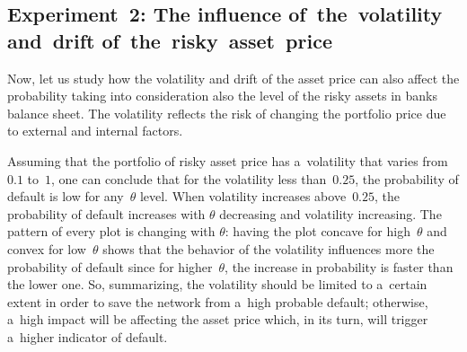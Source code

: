 \begin{multicols}{2}

\subsection{Experiment~2: The influence of~the~volatility and~drift of~the~risky~asset~price}

\noindent
Now, let us study how the volatility and drift of the asset price can also 
affect the probability taking into consideration also the level of the risky 
assets in banks balance sheet.  The volatility reflects the risk of changing the 
portfolio price due to  external and internal factors. 


Assuming that the portfolio of risky asset price has a~volatility that varies 
from~$0.1$ to~$1$, one can conclude that for the volatility less than~$0.25$, 
the probability of default is low for any~$\theta$ level. When volatility 
increases above~$0.25$, the probability of default increases with $\theta$ 
decreasing and volatility increasing. The pattern of every plot is changing with 
$\theta$: having the plot concave for high~$\theta$ and convex for low~$\theta$ 
shows that the behavior of the volatility influences more the probability of 
default since for higher~$\theta$, the increase in probability is faster than the 
lower one. So, summarizing, the volatility should be limited to a~certain extent 
in order to save the network from a~high probable default; otherwise, a~high 
impact will be affecting the asset price which, in its turn, will trigger a~higher 
indicator of default.




        
       
       \begin{figure*} %
       \vspace*{1pt}
\begin{center}
\mbox{%
\epsfxsize=163.212mm
}
\end{center}
\vspace*{-9pt}
        \label{fig:7}
        \end{figure*}
        

\end{multicols}
